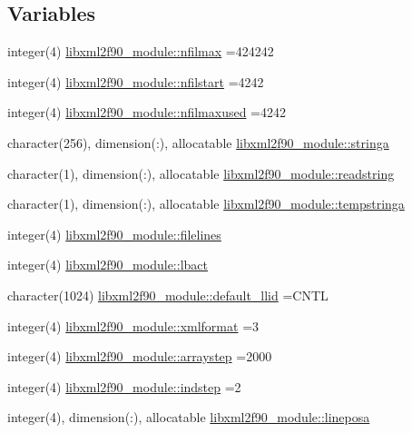 \subsection*{Variables}
\begin{DoxyCompactItemize}
\item 
integer(4) \hyperlink{namespacelibxml2f90__module_ae803c4d10ecfbdc0b6624c004764524e}{libxml2f90\+\_\+module\+::nfilmax} =424242
\item 
integer(4) \hyperlink{namespacelibxml2f90__module_a76bbe7c27297a807f15421a654d7ca6b}{libxml2f90\+\_\+module\+::nfilstart} =4242
\item 
integer(4) \hyperlink{namespacelibxml2f90__module_a217fb75c146107a9cf2983b658274832}{libxml2f90\+\_\+module\+::nfilmaxused} =4242
\item 
character(256), dimension(\+:), allocatable \hyperlink{namespacelibxml2f90__module_ab661dc207b668f91bdee9a3efea3dd49}{libxml2f90\+\_\+module\+::stringa}
\item 
character(1), dimension(\+:), allocatable \hyperlink{namespacelibxml2f90__module_a791c6344181b9375ed7fc4470f4554aa}{libxml2f90\+\_\+module\+::readstring}
\item 
character(1), dimension(\+:), allocatable \hyperlink{namespacelibxml2f90__module_a55e059defbab12f54d54b8f44ad84777}{libxml2f90\+\_\+module\+::tempstringa}
\item 
integer(4) \hyperlink{namespacelibxml2f90__module_a63c8792c8a009d1875c66340984b0879}{libxml2f90\+\_\+module\+::filelines}
\item 
integer(4) \hyperlink{namespacelibxml2f90__module_a958e698155df02283f763fc986f1785f}{libxml2f90\+\_\+module\+::lbact}
\item 
character(1024) \hyperlink{namespacelibxml2f90__module_a2dc8e61fe0a8b9c60b5197984e7b30ae}{libxml2f90\+\_\+module\+::default\+\_\+llid} =\textquotesingle{}C\+N\+T\+L\textquotesingle{}
\item 
integer(4) \hyperlink{namespacelibxml2f90__module_a6e7d9498a3938eb57c8ff2020118098e}{libxml2f90\+\_\+module\+::xmlformat} =3
\item 
integer(4) \hyperlink{namespacelibxml2f90__module_a03a53e403791ec1e112a71f5f2831522}{libxml2f90\+\_\+module\+::arraystep} =2000
\item 
integer(4) \hyperlink{namespacelibxml2f90__module_aef9ff21f71177c723fbac94eeafcb733}{libxml2f90\+\_\+module\+::indstep} =2
\item 
integer(4), dimension(\+:), allocatable \hyperlink{namespacelibxml2f90__module_ad86b3bf7c2ae6ea6856befb154df888f}{libxml2f90\+\_\+module\+::lineposa}

\end{DoxyCompactItemize}
